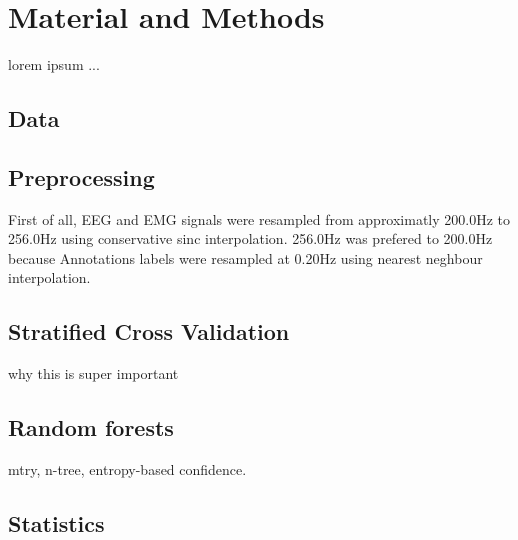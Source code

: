 \section{Material and Methods} \label{matmet}

lorem ipsum ...
\subsection{Data}
\subsection{Preprocessing}

First of all, \gls{EEG} and \gls{EMG} signals were resampled from approximatly 200.0Hz to 256.0Hz using
conservative sinc interpolation. 
256.0Hz was prefered to 200.0Hz because
Annotations labels were resampled at 0.20Hz using nearest neghbour interpolation.



\subsection{Stratified Cross Validation}
why this is super important


\subsection{Random forests}
mtry, n-tree, entropy-based confidence.
\subsection{Statistics}
